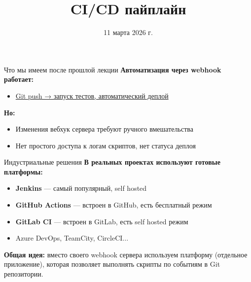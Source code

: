 \documentclass[aspectratio=169]{beamer}
\title{CI/CD пайплайн}
\date{11 марта 2026 г.}
\begin{document}
    \maketitle

    \begin{frame}{Что мы имеем после прошлой лекции}
        \textbf{Автоматизация через webhook работает:}
        
        \begin{itemize}
            \item \href{https://github.com/prafdin/devops-demo-website/tree/webhook-demo}{Git push → запуск тестов, автоматический деплой}
        \end{itemize}

        \textbf{Но:}

        \begin{itemize}
            \item Изменения вебхук сервера требуют ручного вмешательства
            \item Нет простого доступа к логам скриптов, нет статуса деплоя
        \end{itemize}
    \end{frame}

    \begin{frame}{Индустриальные решения}
        \textbf{В реальных проектах используют готовые платформы:}
        
        \begin{itemize}
            \item \textbf{Jenkins} — самый популярный, self hosted
            \item \textbf{GitHub Actions} — встроен в GitHub, есть бесплатный режим
            \item \textbf{GitLab CI} — встроен в GitLab, есть self hosted режим
            \item Azure DevOps, TeamCity, CircleCI...
        \end{itemize}
        
        \vspace{0.5cm}
        
        \textbf{Общая идея:} вместо своего webhook сервера используем платформу (отдельное приложение), которая позволяет выполнять
        скрипты по событиям в Git репозитории.
    \end{frame}
\end{document}
